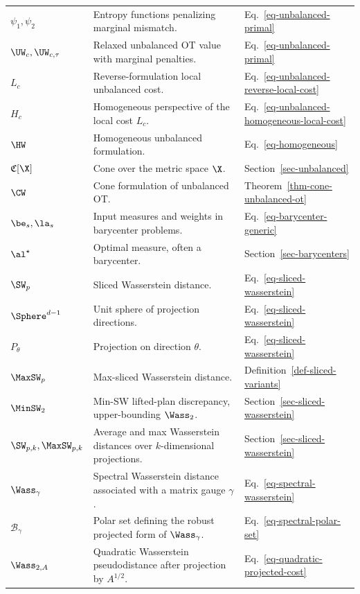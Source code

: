 {\begin{longtable}{>{\raggedright\arraybackslash}p{}
                  >{\raggedright\arraybackslash}p{}
                  >{\raggedright\arraybackslash}p{}}
\pagebreak[4]
\hline
\multicolumn{3}{l}{\textbf{Extensions of OT}}\\
\hline
$\psi_1,\psi_2$ & Entropy functions penalizing marginal mismatch. & Eq.~\eqref{eq-unbalanced-primal} \\
$\UW_c,\UW_{c,\tau}$ & Relaxed unbalanced OT value with marginal penalties. & Eq.~\eqref{eq-unbalanced-primal} \\
$L_c$ & Reverse-formulation local unbalanced cost. & Eq.~\eqref{eq-unbalanced-reverse-local-cost} \\
$H_c$ & Homogeneous perspective of the local cost $L_c$. & Eq.~\eqref{eq-unbalanced-homogeneous-local-cost} \\
$\HW$ & Homogeneous unbalanced formulation. & Eq.~\eqref{eq-homogeneous} \\
$\mathfrak{C}[\X]$ & Cone over the metric space $\X$. & Section~\ref{sec-unbalanced} \\
$\CW$ & Cone formulation of unbalanced OT. & Theorem~\ref{thm-cone-unbalanced-ot} \\
$\be_s,\la_s$ & Input measures and weights in barycenter problems. & Eq.~\eqref{eq-barycenter-generic} \\
$\al^\star$ & Optimal measure, often a barycenter. & Section~\ref{sec-barycenters} \\
$\SW_p$ & Sliced Wasserstein distance. & Eq.~\eqref{eq-sliced-wasserstein} \\
$\Sphere^{d-1}$ & Unit sphere of projection directions. & Eq.~\eqref{eq-sliced-wasserstein} \\
$P_\theta$ & Projection on direction $\theta$. & Eq.~\eqref{eq-sliced-wasserstein} \\
$\MaxSW_p$ & Max-sliced Wasserstein distance. & Definition~\ref{def-sliced-variants} \\
$\MinSW_2$ & Min-SW lifted-plan discrepancy, upper-bounding $\Wass_2$. & Section~\ref{sec-sliced-wasserstein} \\
$\SW_{p,k},\MaxSW_{p,k}$ & Average and max Wasserstein distances over $k$-dimensional projections. & Section~\ref{sec-sliced-wasserstein} \\
$\Wass_\gamma$ & Spectral Wasserstein distance associated with a matrix gauge $\gamma$. & Eq.~\eqref{eq-spectral-wasserstein} \\
$\mathcal B_\gamma$ & Polar set defining the robust projected form of $\Wass_\gamma$. & Eq.~\eqref{eq-spectral-polar-set} \\
$\Wass_{2,A}$ & Quadratic Wasserstein pseudodistance after projection by $A^{1/2}$. & Eq.~\eqref{eq-quadratic-projected-cost} \\

\end{longtable}}
